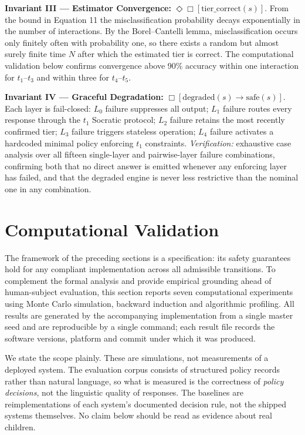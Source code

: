 \documentclass[fleqn,10pt]{wlscirep}
\begin{document}
\textbf{Invariant III --- Estimator Convergence:} $\Diamond\Box[\text{tier\_correct}(s)]$. From the bound in Equation 11 the misclassification probability decays exponentially in the number of interactions. By the Borel--Cantelli lemma, misclassification occurs only finitely often with probability one, so there exists a random but almost surely finite time $N$ after which the estimated tier is correct. The computational validation below confirms convergence above 90\% accuracy within one interaction for $t_1$--$t_3$ and within three for $t_4$--$t_5$.

\textbf{Invariant IV --- Graceful Degradation:} $\Box[\text{degraded}(s) \rightarrow \text{safe}(s)]$. Each layer is fail-closed: $L_0$ failure suppresses all output; $L_1$ failure routes every response through the $t_1$ Socratic protocol; $L_2$ failure retains the most recently confirmed tier; $L_3$ failure triggers stateless operation; $L_4$ failure activates a hardcoded minimal policy enforcing $t_1$ constraints. \emph{Verification:} exhaustive case analysis over all fifteen single-layer and pairwise-layer failure combinations, confirming both that no direct answer is emitted whenever any enforcing layer has failed, and that the degraded engine is never less restrictive than the nominal one in any combination.

\section*{Computational Validation}

The framework of the preceding sections is a specification: its safety guarantees hold for any compliant implementation across all admissible transitions. To complement the formal analysis and provide empirical grounding ahead of human-subject evaluation, this section reports seven computational experiments using Monte Carlo simulation, backward induction and algorithmic profiling. All results are generated by the accompanying implementation from a single master seed and are reproducible by a single command; each result file records the software versions, platform and commit under which it was produced.

We state the scope plainly. These are simulations, not measurements of a deployed system. The evaluation corpus consists of structured policy records rather than natural language, so what is measured is the correctness of \emph{policy decisions}, not the linguistic quality of responses. The baselines are reimplementations of each system's documented decision rule, not the shipped systems themselves. No claim below should be read as evidence about real children.
\end{document}

